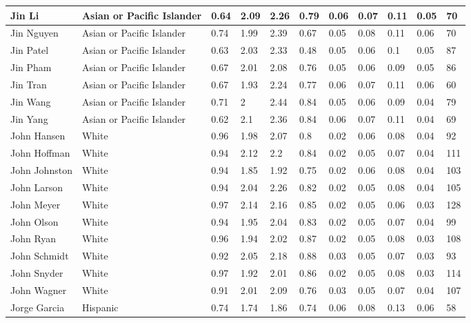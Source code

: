 \begin{table}[!ht]
\begin{tabular}{|l|l|l|l|l|l|l|l|l|l|l|}
        Jin Li & Asian or Pacific Islander & 0.64 & 2.09 & 2.26 & 0.79 & 0.06 & 0.07 & 0.11 & 0.05 & 70 \\ \hline
        Jin Nguyen & Asian or Pacific Islander & 0.74 & 1.99 & 2.39 & 0.67 & 0.05 & 0.08 & 0.11 & 0.06 & 70 \\ \hline
        Jin Patel & Asian or Pacific Islander & 0.63 & 2.03 & 2.33 & 0.48 & 0.05 & 0.06 & 0.1 & 0.05 & 87 \\ \hline
        Jin Pham & Asian or Pacific Islander & 0.67 & 2.01 & 2.08 & 0.76 & 0.05 & 0.06 & 0.09 & 0.05 & 86 \\ \hline
        Jin Tran & Asian or Pacific Islander & 0.67 & 1.93 & 2.24 & 0.77 & 0.06 & 0.07 & 0.11 & 0.06 & 60 \\ \hline
        Jin Wang & Asian or Pacific Islander & 0.71 & 2 & 2.44 & 0.84 & 0.05 & 0.06 & 0.09 & 0.04 & 79 \\ \hline
        Jin Yang & Asian or Pacific Islander & 0.62 & 2.1 & 2.36 & 0.84 & 0.06 & 0.07 & 0.11 & 0.04 & 69 \\ \hline
        John Hansen & White & 0.96 & 1.98 & 2.07 & 0.8 & 0.02 & 0.06 & 0.08 & 0.04 & 92 \\ \hline
        John Hoffman & White & 0.94 & 2.12 & 2.2 & 0.84 & 0.02 & 0.05 & 0.07 & 0.04 & 111 \\ \hline
        John Johnston & White & 0.94 & 1.85 & 1.92 & 0.75 & 0.02 & 0.06 & 0.08 & 0.04 & 103 \\ \hline
        John Larson & White & 0.94 & 2.04 & 2.26 & 0.82 & 0.02 & 0.05 & 0.08 & 0.04 & 105 \\ \hline
        John Meyer & White & 0.97 & 2.14 & 2.16 & 0.85 & 0.02 & 0.05 & 0.06 & 0.03 & 128 \\ \hline
        John Olson & White & 0.94 & 1.95 & 2.04 & 0.83 & 0.02 & 0.05 & 0.07 & 0.04 & 99 \\ \hline
        John Ryan & White & 0.96 & 1.94 & 2.02 & 0.87 & 0.02 & 0.05 & 0.08 & 0.03 & 108 \\ \hline
        John Schmidt & White & 0.92 & 2.05 & 2.18 & 0.88 & 0.03 & 0.05 & 0.07 & 0.03 & 93 \\ \hline
        John Snyder & White & 0.97 & 1.92 & 2.01 & 0.86 & 0.02 & 0.05 & 0.08 & 0.03 & 114 \\ \hline
        John Wagner & White & 0.91 & 2.01 & 2.09 & 0.76 & 0.03 & 0.05 & 0.07 & 0.04 & 107 \\ \hline
        Jorge Garcia & Hispanic & 0.74 & 1.74 & 1.86 & 0.74 & 0.06 & 0.08 & 0.13 & 0.06 & 58 \\ \hline

\end{tabular}
\end{table}
